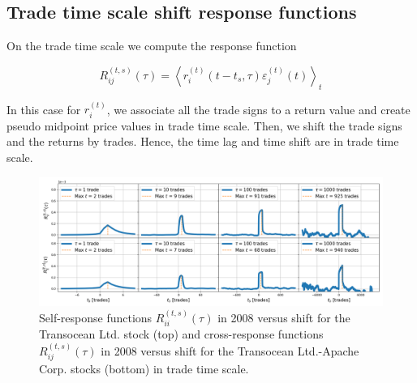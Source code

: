 \subsection{Trade time scale shift response functions}
\label{subsec:time_shift_trade}

On the trade time scale we compute the response function

\begin{equation}\label{eq:time_shift_trade}
    R_{ij}^{\left(t, s\right)}\left(\tau\right)=\left\langle r^{\left(t\right)}
    _{i} \left(t-t_{s},\tau\right) \varepsilon^{\left(t\right)}_{j}
    \left(t\right)\right\rangle _{t}
\end{equation}

In this case for $r^{\left(t\right)}_{i}$, we associate all the trade signs to
a return value and create pseudo midpoint price values in trade time scale.
Then, we shift the trade signs and the returns by trades. Hence, the time lag
and time shift are in trade time scale.

\begin{figure}[htbp]
    \centering
    \includegraphics[width=\textwidth]{figures/04_shift_trade_RIG_APA.png}
    \caption{Self-response functions
             $R_{ii}^{\left(t, s\right)}\left(\tau\right)$ in 2008 versus shift
             for the Transocean Ltd. stock (top) and cross-response functions
             $R_{ij}^{\left(t, s\right)}\left(\tau\right)$ in 2008 versus shift
             for the Transocean Ltd.-Apache Corp. stocks (bottom) in trade time
             scale.}
    \label{fig:shift_trade_scale}
\end{figure}

